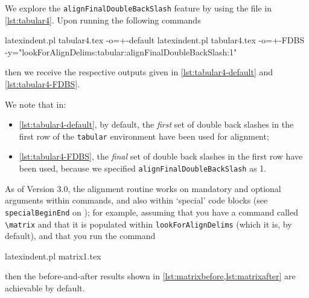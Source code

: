 	We explore%
	 the
	\texttt{alignFinalDoubleBackSlash} feature by using the file in \cref{lst:tabular4}. Upon
	running the following commands
	\begin{commandshell}
latexindent.pl tabular4.tex -o=+-default
latexindent.pl tabular4.tex -o=+-FDBS -y="lookForAlignDelims:tabular:alignFinalDoubleBackSlash:1"
\end{commandshell}
	then we receive the respective outputs given in \cref{lst:tabular4-default} and
	\cref{lst:tabular4-FDBS}.

	\begin{cmhtcbraster}[raster columns=3,
			raster left skip=-3.75cm,
			raster right skip=-2cm,]
	\end{cmhtcbraster}

	We note that in:
	\begin{itemize}
		\item \cref{lst:tabular4-default}, by default, the \emph{first} set of double back
		      slashes in the first row of the \texttt{tabular} environment have been used for
		      alignment;
		\item \cref{lst:tabular4-FDBS}, the \emph{final} set of double back slashes in the
		      first row have been used, because we specified \texttt{alignFinalDoubleBackSlash} as 1.
	\end{itemize}

	As of Version 3.0, the alignment routine works on mandatory and optional arguments within
	commands, and also within `special' code blocks (see \texttt{specialBeginEnd} on
	); for example, assuming that you have a command called
	\lstinline!\matrix! and that it is populated within \texttt{lookForAlignDelims} (which it is, by default), and that
	you run the command
	\begin{commandshell}
latexindent.pl matrix1.tex 
\end{commandshell}
	then the before-and-after results shown in \cref{lst:matrixbefore,lst:matrixafter} are achievable by
	default.

	\begin{cmhtcbraster}
	\end{cmhtcbraster}

